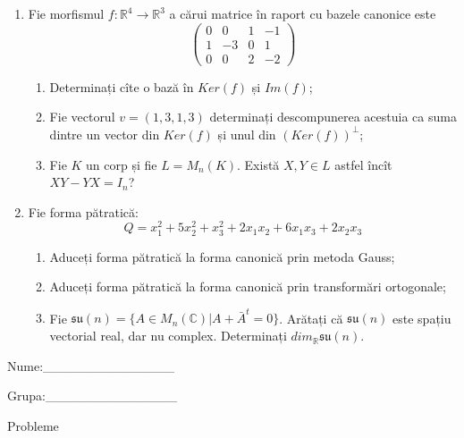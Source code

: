 \documentclass{article}
\begin{document}
\begin{enumerate}
 \item Fie morfismul $f:\mathbb{R}^4 \to \mathbb{R}^3$ a cărui matrice în raport cu bazele canonice este
$$\begin{pmatrix}
0&0&1&-1\\
1&-3&0&1\\
0&0&2&-2
\end{pmatrix}$$

\begin{enumerate}
\item Determinați cîte o bază în $Ker(f)$ și $Im(f)$;
\item Fie vectorul $v=(1,3,1,3)$ determinați descompunerea acestuia ca suma dintre un vector din $Ker(f)$ și unul din $(Ker(f))^\perp$;
\item Fie $K$ un corp și fie $L=M_n(K)$. Există $X,Y \in L$ astfel încît $XY-YX=I_n$?  
\end{enumerate}
\item Fie forma pătratică:
$$Q= x_1^2+5x_2^2+x_3^2+2x_1x_2+6x_1x_3+2x_2x_3$$

\begin{enumerate}
\item Aduceți forma pătratică la forma canonică prin metoda Gauss;
\item Aduceți forma pătratică la forma canonică prin transformări ortogonale;
\item Fie $\mathfrak{su}(n)=\{ A \in M_n(\mathbb{C}) | A+\bar{A}^t=0\}$. Arătați că $\mathfrak{su}(n)$ este spațiu vectorial real, dar nu complex.
Determinați $dim_{\mathbb{R}}\mathfrak{su}(n)$.
\end{enumerate}
\end{enumerate}
\newpage
\begin{flushright}
Nume:\_\_\_\_\_\_\_\_\_\_\_\_\_\_
 
 
Grupa:\_\_\_\_\_\_\_\_\_\_\_\_\_\_
\end{flushright}
\begin{center}
\vspace{2cm}
{\Large Probleme}
\vspace{2cm}
\end{center}
\end{document}
